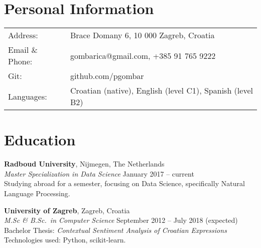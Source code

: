 \documentclass[margin,line]{resume}
\begin{document}
\begin{resume}

\section{\mysidestyle Personal Information}

\begin{tabular}{@{}ll@{}}
Address: & Brace Domany 6, 10 000 Zagreb, Croatia \\
Email \& Phone: & gombarica@gmail.com, +385 91 765 9222 \\
Git: & github.com/pgombar \\
Languages: & Croatian (native), English (level C1), Spanish (level B2) \\
\end{tabular}

\section{\mysidestyle Education}

\textbf{Radboud University}, Nijmegen, The Netherlands \vspace{1mm}\\\vspace{1mm}%
\textsl{Master Specialization in Data Science} \hfill January 2017 -- current\\%
Studying abroad for a semester, focusing on Data Science, specifically Natural Language Processing.\\
\vspace{-3mm}\hspace{-1mm}\hfill%

\vspace{-2mm}
\textbf{University of Zagreb}, Zagreb, Croatia \vspace{1mm}\\\vspace{1mm}%
\textsl{M.Sc \& B.Sc.\ in Computer Science} \hfill September 2012 -- July 2018 (expected)\\%
Bachelor Thesis: \textit{Contextual Sentiment Analysis of Croatian Expressions}\\
Technologies used: Python, scikit-learn.


\end{resume}
\end{document}
